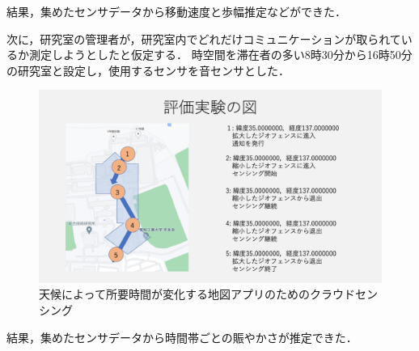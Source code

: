 結果，集めたセンサデータから移動速度と歩幅推定などができた．

次に，研究室の管理者が，研究室内でどれだけコミュニケーションが取られているか測定しようとしたと仮定する．
時空間を滞在者の多い8時30分から16時50分の研究室と設定し，使用するセンサを音センサとした．

\begin{figure}[tbh]
    \centering
    \includegraphics[width=16cm]{img_ex_case_2.png}
    \caption{天候によって所要時間が変化する地図アプリのためのクラウドセンシング}
    \label{fig:ex_case_2}
\end{figure}

結果，集めたセンサデータから時間帯ごとの賑やかさが推定できた．

